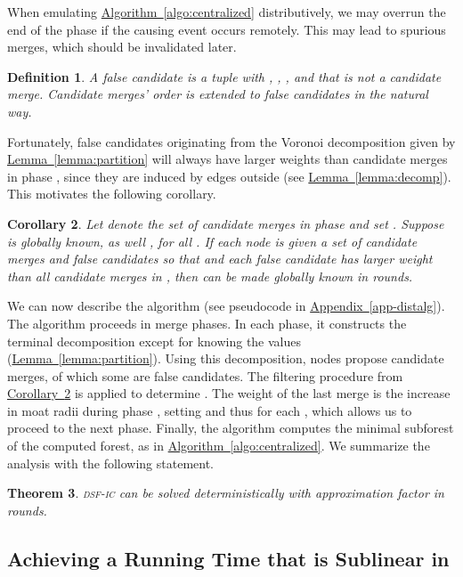 \documentclass[letterpaper,11pt]{article}
\newtheorem{theorem}{Theorem}[section]
\newtheorem{definition}[theorem]{Definition}
\newtheorem{corollary}[theorem]{Corollary}
\newcommand{\namedref}[2]{\hyperref[#2]{#1~\ref*{#2}}}
\newcommand{\lemmaref}[1]{\namedref{Lemma}{#1}}
\newcommand{\corollaryref}[1]{\namedref{Corollary}{#1}}
\newcommand{\appref}[1]{\namedref{Appendix}{#1}}
\newcommand{\algref}[1]{\namedref{Algorithm}{#1}}
\newcommand{\sfic}{\textsc{dsf-ic}\xspace}
\begin{document}
When emulating \algref{algo:centralized} distributively, we may
overrun the end of the phase if the causing event occurs
remotely. This may lead to spurious merges, which should be
invalidated later.

\begin{definition}
A \emph{false candidate} is a tuple  with ,
, , and  that is not a candidate
merge. Candidate merges' order is extended to false candidates in the
natural way.
\end{definition}

Fortunately, false candidates originating from the  Voronoi
decomposition given by \lemmaref{lemma:partition} will always have larger
weights than candidate merges in phase , since they are 
induced by edges outside  (see \lemmaref{lemma:decomp}). This
motivates the following corollary.

\begin{corollary}\label{coro:filtering}
Let  denote the set of candidate merges in phase  and set
. Suppose
 is globally known, as well
, for all . If each node  
is given a set  of candidate merges and false candidates so that
 and each false candidate has larger
weight than all candidate merges in , then  can be made
globally known in  rounds.
\end{corollary}

We can now describe the algorithm (see pseudocode in
\appref{app-distalg}). The algorithm
proceeds in merge phases. In each phase, it constructs the
 terminal decomposition except for knowing the  values
(\lemmaref{lemma:partition}). Using this decomposition, nodes propose
candidate merges, of which some are false candidates. The filtering
procedure from \corollaryref{coro:filtering} is applied to determine
. The weight of the last merge
is the increase in moat radii during phase , setting
 and thus  for each , which allows us
to proceed to the next phase. Finally, the algorithm computes
the minimal subforest of the computed forest,  as in 
\algref{algo:centralized}. We summarize the analysis with the
following statement.


\begin{theorem}\label{theorem:2_distributed}
\sfic can be solved deterministically with approximation factor  in
 rounds.
\end{theorem}

\subsection{Achieving a Running Time that is Sublinear in
\texorpdfstring{}{t}}
\label{sec:sublinear}
\end{document}

